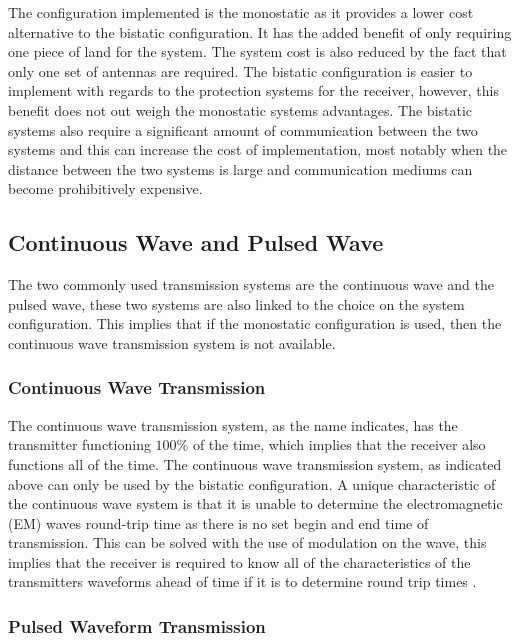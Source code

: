 \documentclass[11pt]{witseiepaper}
\begin{document}
The configuration implemented is the monostatic as it provides a lower cost alternative to the bistatic configuration. It has the added benefit of only requiring one piece of land for the system. The system cost is also reduced by the fact that only one set of antennas are required.
The bistatic configuration is easier to implement with regards to the protection systems for the receiver, however, this benefit does not out weigh the monostatic systems advantages. The bistatic systems also require a significant amount of communication between the two systems and this can increase the cost of implementation, most notably when the distance between the two systems is large and communication mediums can become prohibitively expensive.

\subsection{Continuous Wave and Pulsed Wave}

The two commonly used transmission systems are the continuous wave and the pulsed wave, these two systems are also linked to the choice on the system configuration.
This implies that if the monostatic configuration is used, then the continuous wave transmission system is not available.

\subsubsection{Continuous Wave Transmission}

The continuous wave transmission system, as the name indicates, has the transmitter functioning $100\%$ of the time, which implies that the receiver also functions all of the time. The continuous wave transmission system, as indicated above can only be used by the bistatic configuration. 
A unique characteristic of the continuous wave system is that it is unable to determine the electromagnetic (EM) waves round-trip time as there is no set begin and end time of transmission. This can be solved with the use of modulation on the wave, this implies that the receiver is required to know all of the characteristics of the transmitters waveforms ahead of time if it is to determine round trip times \cite[p.~20]{radarHandbook}.

\subsubsection{Pulsed Waveform Transmission}
\end{document}
